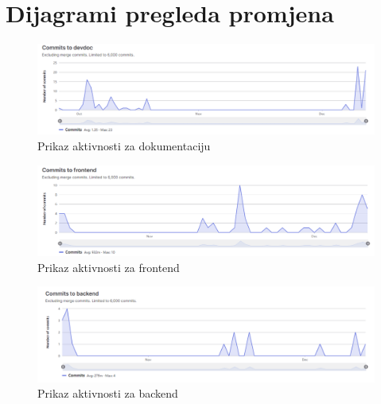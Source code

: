 					
		\eject
		\section*{Dijagrami pregleda promjena}
		
		\begin{figure}[H]
			\includegraphics[width=\textwidth]{slike/dokumentacija.PNG} 
			\caption{Prikaz aktivnosti za dokumentaciju}
			\label{fig:Dokumentacija}
		\end{figure}
	
		\begin{figure}[H]
			\includegraphics[width=\textwidth]{slike/frontend.PNG} 
			\caption{Prikaz aktivnosti za frontend}
			\label{fig:Frontend}
		\end{figure}
		
		\begin{figure}[H]
			\includegraphics[width=\textwidth]{slike/backend.PNG} 
			\caption{Prikaz aktivnosti za backend}
			\label{fig:Backend}
		\end{figure}
	
		
	
